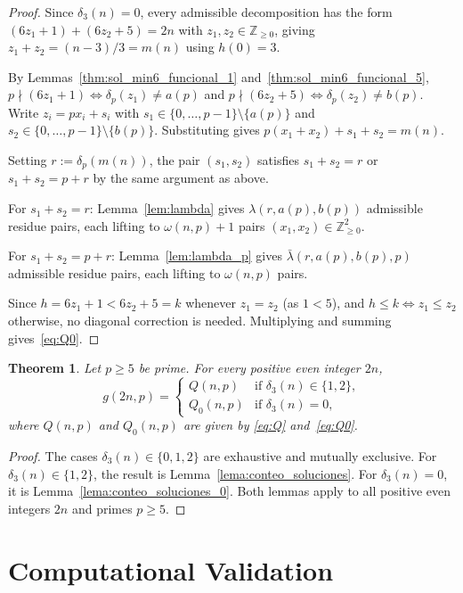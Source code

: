 \documentclass[12pt]{article}
\newtheorem{theorem}{Theorem}[section]
\begin{document}
\begin{proof}
Since $\delta_3(n)=0$, every admissible decomposition has the form
$(6z_1+1)+(6z_2+5)=2n$ with $z_1,z_2 \in \mathbb{Z}_{\ge 0}$,
giving $z_1+z_2=(n-3)/3=m(n)$ using $h(0)=3$.

By Lemmas~\ref{thm:sol_min6_funcional_1}
and~\ref{thm:sol_min6_funcional_5},
$p \nmid (6z_1+1) \iff \delta_p(z_1) \ne a(p)$ and
$p \nmid (6z_2+5) \iff \delta_p(z_2) \ne b(p)$.
Write $z_i=px_i+s_i$ with
$s_1 \in \{0,\dots,p-1\}\setminus\{a(p)\}$ and
$s_2 \in \{0,\dots,p-1\}\setminus\{b(p)\}$.
Substituting gives $p(x_1+x_2)+s_1+s_2=m(n)$.

Setting $r:=\delta_p(m(n))$, the pair $(s_1,s_2)$ satisfies
$s_1+s_2=r$ or $s_1+s_2=p+r$ by the same argument as above.

For $s_1+s_2=r$: Lemma~\ref{lem:lambda} gives
$\lambda(r,a(p),b(p))$ admissible residue pairs, each lifting to
$\omega(n,p)+1$ pairs $(x_1,x_2) \in \mathbb{Z}_{\ge 0}^2$.

For $s_1+s_2=p+r$: Lemma~\ref{lem:lambda_p} gives
$\bar{\lambda}(r,a(p),b(p),p)$ admissible residue pairs, each
lifting to $\omega(n,p)$ pairs.

Since $h=6z_1+1 < 6z_2+5=k$ whenever $z_1=z_2$
(as $1 < 5$), and $h \le k \iff z_1 \le z_2$ otherwise,
no diagonal correction is needed.
Multiplying and summing gives~\eqref{eq:Q0}.
\end{proof}

\begin{theorem}\label{thm:main}
Let $p \ge 5$ be prime.
For every positive even integer $2n$,
\[
g(2n,p)
=
\begin{cases}
Q(n,p)   & \text{if } \delta_3(n)\in\{1,2\},\\
Q_0(n,p) & \text{if } \delta_3(n)=0,
\end{cases}
\]
where $Q(n,p)$ and $Q_0(n,p)$ are given by
\eqref{eq:Q} and~\eqref{eq:Q0}.
\end{theorem}

\begin{proof}
The cases $\delta_3(n)\in\{0,1,2\}$ are exhaustive and mutually
exclusive. For $\delta_3(n)\in\{1,2\}$, the result is
Lemma~\ref{lema:conteo_soluciones}. For $\delta_3(n)=0$, it is
Lemma~\ref{lema:conteo_soluciones_0}. Both lemmas apply to all
positive even integers $2n$ and primes $p \ge 5$.
\end{proof}


\section{Computational Validation}
\label{sec:validation}
\end{document}
